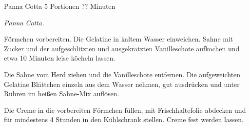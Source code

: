 \begin{recipe}{Panna Cotta} {5 Portionen} {?? Minuten}

  \freeform
  \textit{Panna Cotta.}


  Förmchen vorbereiten.
  Die Gelatine in kaltem Wasser einweichen.
  Sahne mit Zucker und der aufgeschlitzten und ausgekratzten Vanilleschote aufkochen und etwa 10 Minuten leise köcheln lassen.

  \newstep
  Die Sahne vom Herd ziehen und die Vanilleschote entfernen.
  Die aufgeweichten Gelatine Blättchen einzeln aus dem Wasser nehmen, gut ausdrücken und unter Rühren im heißen Sahne-Mix auflösen.

  \newstep
  Die Creme in die vorbereiten Förmchen füllen, mit Frischhaltefolie abdecken und für mindestens 4 Stunden in den Kühlschrank stellen.
  Creme fest werden lassen.

  \freeform
  \hrulefill

\end{recipe}

